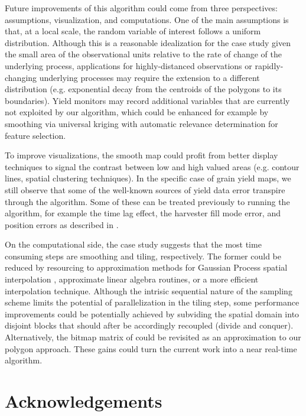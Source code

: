 \documentclass[12pt]{article}
\begin{document}
Future improvements of this
algorithm could come from three perspectives: assumptions,
visualization, and computations. One of the main assumptions is that,
at a local scale, the random variable of interest follows a uniform
distribution. Although this is a reasonable idealization for the case
study given the small area of the observational units relative to the
rate of change of the underlying process, applications for
highly-distanced observations or rapidly-changing underlying processes
may require the extension to a different distribution
(e.g. exponential decay from the centroids of the polygons to its
boundaries). Yield monitors may record additional variables that are
currently not exploited by our algorithm, which could be enhanced for
example by smoothing via universal kriging with automatic relevance
determination for feature selection.

To improve visualizations,
the smooth map could profit from better display techniques to signal
the contrast between low and high valued areas (e.g. contour lines,
spatial clustering techniques). In the specific case of grain yield
maps, we still observe that some of the well-known sources of yield
data error transpire through the algorithm. Some of these can be
treated previously to running the algorithm, for example the time lag
effect, the harvester fill mode error, and position errors as
described in \cite{Blackmore1999}.

On the computational side, the
case study suggests that the most time consuming steps are smoothing
and tiling, respectively. The former could be reduced by resourcing to
approximation methods for Gaussian Process spatial interpolation
\citep{Shi2007,Cressie2008,Katzfuss2011,Nguyen2012,Nguyen2014},
approximate linear algebra routines, or a more efficient interpolation
technique. Although the intrisic sequential nature of the sampling
scheme limits the potential of parallelization in the tiling step,
some performance improvements could be potentially achieved by
subviding the spatial domain into disjoint blocks that should after be
accordingly recoupled (divide and conquer). Alternatively, the bitmap
matrix of \cite{Han1997} could be revisited as an approximation to our
polygon approach. These gains could turn the current work into a near
real-time algorithm.



\section{Acknowledgements}
\end{document}
